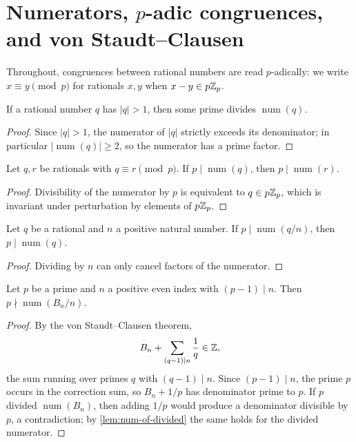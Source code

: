\section{Numerators, $p$-adic congruences, and von Staudt--Clausen}

Throughout, congruences between rational numbers are read $p$-adically: we
write $x \equiv y \pmod{p}$ for rationals $x,y$ when $x - y \in p\mathbb{Z}_p$.

\begin{lemma}\label{lem:num-prime-of-large}
  \leanok
If a rational number $q$ has $|q| > 1$, then some prime divides
$\operatorname{num}(q)$.
\end{lemma}
\begin{proof}\leanok
Since $|q| > 1$, the numerator of $|q|$ strictly exceeds its denominator;
in particular $|\operatorname{num}(q)| \ge 2$, so the numerator has a prime
factor.
\end{proof}

\begin{lemma}\label{lem:num-transport}
  \leanok
Let $q, r$ be rationals with $q \equiv r \pmod{p}$.  If
$p\mid\operatorname{num}(q)$, then $p\mid\operatorname{num}(r)$.
\end{lemma}
\begin{proof}\leanok
Divisibility of the numerator by $p$ is equivalent to $q \in p\mathbb{Z}_p$, which is
invariant under perturbation by elements of $p\mathbb{Z}_p$.
\end{proof}

\begin{lemma}\label{lem:num-of-divided}
  \leanok
Let $q$ be a rational and $n$ a positive natural number.  If
$p\mid\operatorname{num}(q/n)$, then $p\mid\operatorname{num}(q)$.
\end{lemma}
\begin{proof}\leanok
Dividing by $n$ can only cancel factors of the numerator.
\end{proof}

\begin{theorem}\label{thm:vonstaudt-not-dvd-divided}
  \leanok
Let $p$ be a prime and $n$ a positive even index with $(p-1)\mid n$.  Then
$p\nmid\operatorname{num}(B_n/n)$.
\end{theorem}
\begin{proof}\leanok
By the von Staudt--Clausen theorem,
\[
  B_n + \sum_{(q-1)\mid n} \frac{1}{q} \in \mathbb{Z},
\]
the sum running over primes $q$ with $(q-1)\mid n$.  Since $(p-1)\mid n$, the
prime $p$ occurs in the correction sum, so $B_n + 1/p$ has denominator prime
to $p$.  If $p$ divided $\operatorname{num}(B_n)$, then adding $1/p$ would
produce a denominator divisible by $p$, a contradiction; by
\cref{lem:num-of-divided} the same holds for the divided numerator.
\end{proof}

